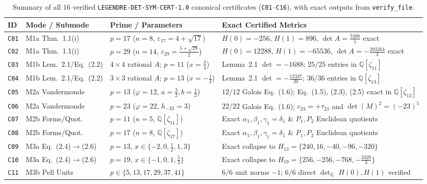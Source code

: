 \documentclass[10pt,twocolumn]{article}
\begin{document}
\begin{table}[t]
\centering
\scriptsize
\setlength{\tabcolsep}{4.0pt}
\caption{Summary of all 16 verified \texttt{LEGENDRE-DET-SYM-CERT-1.0} canonical certificates (\texttt{C01}--\texttt{C16}), with exact outputs from \texttt{verify\_file}.}
\label{tab:certs}
\begin{tabular}{@{}llll@{}}
\toprule
ID & Mode / Submode & Prime / Parameters & Exact Certified Metrics \\
\midrule
\texttt{C01} & M1a Thm.~1.1(i) & $p=17$ ($n=8$, $\varepsilon_{17}=4+\sqrt{17}$) & $H(0)=-256$, $H(1)=896$, $\det A = \tfrac{7488}{5}$ exact \\
\texttt{C02} & M1a Thm.~1.1(i) & $p=29$ ($n=14$, $\varepsilon_{29}=\tfrac{5+\sqrt{29}}{2}$) & $H(0)=12288$, $H(1)=-65536$, $\det A = -\tfrac{203264}{3}$ exact \\
\texttt{C03} & M1b Lem.~2.1/Eq.~(2.2) & $4\times 4$ rational $A$; $p=11$ ($x=\tfrac{3}{4}$) & Lemma~2.1 $\det=-1688$; $25/25$ entries in $\mathbb{Q}[\zeta_{11}]$ \\
\texttt{C04} & M1b Lem.~2.1/Eq.~(2.2) & $3\times 3$ rational $A$; $p=13$ ($x=-\tfrac{1}{2}$) & Lemma~2.1 $\det=-\tfrac{12337}{20}$; $36/36$ entries in $\mathbb{Q}[\zeta_{13}]$ \\
\texttt{C05} & M2a Vandermonde & $p=13$ ($\varphi=12$, $a=\tfrac{3}{2}, b=\tfrac{1}{2}$) & $12/12$ Galois Eq.~(1.6); Eq.~(1.5), (2.3), (2.5) exact in $\mathbb{Q}[\zeta_{13}]$ \\
\texttt{C06} & M2a Vandermonde & $p=23$ ($\varphi=22$, $h_{-23}=3$) & $22/22$ Galois Eq.~(1.6); $c_{23}=+\tau_{23}$ and $\det(M)^2=(-23)^5$ \\
\texttt{C07} & M2b Forms/Quot. & $p=11$ ($n=5$, $\mathbb{Q}[\zeta_{11}]$) & Exact $\alpha_1,\beta_1,\gamma_1=\delta_1$ \& $P_1,P_2$ Euclidean quotients \\
\texttt{C08} & M2b Forms/Quot. & $p=17$ ($n=8$, $\mathbb{Q}[\zeta_{17}]$) & Exact $\alpha_1,\beta_1,\gamma_1=\delta_1$ \& $P_1,P_2$ Euclidean quotients \\
\texttt{C09} & M3a Eq.~(2.4)$\to$(2.6) & $p=13$, $x\in\{-2,0,\tfrac{1}{2},1,3\}$ & Exact collapse to $H_{13}=\{240,16,-40,-96,-320\}$ \\
\texttt{C10} & M3a Eq.~(2.4)$\to$(2.6) & $p=19$, $x\in\{-1,0,1,\tfrac{5}{3}\}$ & Exact collapse to $H_{19}=\{256,-256,-768,-\tfrac{3328}{3}\}$ \\
\texttt{C11} & M3b Pell Units & $p\in\{5,13,17,29,37,41\}$ & $6/6$ unit norms $-1$; $6/6$ direct $\det_{\mathbb{Q}}$ $H(0),H(1)$ verified \\

\end{tabular}
\end{table}
\end{document}
